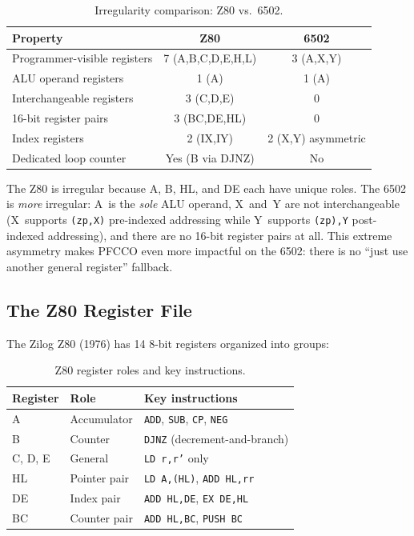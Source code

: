 \documentclass[sigplan,screen,nonacm]{acmart}
\begin{document}
\begin{table}[h]
\centering\small
\caption{Irregularity comparison: Z80 vs.\ 6502.}
\label{tab:irregularity}
\begin{tabular}{@{}lcc@{}}
\toprule
Property & Z80 & 6502 \\
\midrule
Programmer-visible registers & 7 (A,B,C,D,E,H,L)  & 3 (A,X,Y) \\
ALU operand registers        & 1 (A)               & 1 (A) \\
Interchangeable registers    & 3 (C,D,E)           & 0 \\
16-bit register pairs        & 3 (BC,DE,HL)        & 0 \\
Index registers              & 2 (IX,IY)           & 2 (X,Y) asymmetric \\
Dedicated loop counter       & Yes (B via DJNZ)    & No \\
\bottomrule
\end{tabular}
\end{table}

\noindent The Z80 is irregular because A, B, HL, and DE each have unique
roles.  The 6502 is \emph{more} irregular: A~is the \emph{sole} ALU
operand, X~and~Y are not interchangeable (X~supports \texttt{(zp,X)}
pre-indexed addressing while Y~supports \texttt{(zp),Y} post-indexed
addressing), and there are no 16-bit register pairs at all.  This extreme
asymmetry makes PFCCO even more impactful on the 6502: there is no ``just
use another general register'' fallback.

\subsection{The Z80 Register File}

The Zilog Z80 (1976) has 14 8-bit registers organized into groups:

\begin{table}[h]
\centering\small
\caption{Z80 register roles and key instructions.}
\label{tab:z80regs}
\begin{tabular}{@{}lll@{}}
\toprule
Register & Role & Key instructions \\
\midrule
A        & Accumulator   & \texttt{ADD}, \texttt{SUB}, \texttt{CP}, \texttt{NEG} \\
B        & Counter       & \texttt{DJNZ} (decrement-and-branch) \\
C, D, E  & General       & \texttt{LD r,r'} only \\
HL       & Pointer pair  & \texttt{LD A,(HL)}, \texttt{ADD HL,rr} \\
DE       & Index pair    & \texttt{ADD HL,DE}, \texttt{EX DE,HL} \\
BC       & Counter pair  & \texttt{ADD HL,BC}, \texttt{PUSH BC} \\
\bottomrule
\end{tabular}
\end{table}
\end{document}
